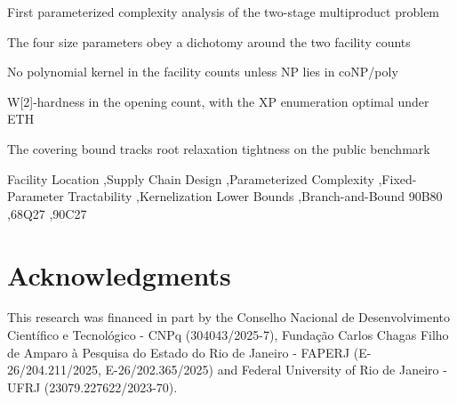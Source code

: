 \documentclass[a4paper,fleqn]{cas-sc}
\theoremstyle{definition}
\theoremstyle{remark}
\begin{document}
\begin{highlights}
\item First parameterized complexity analysis of the two-stage
multiproduct problem
\item The four size parameters obey a dichotomy around the two facility
counts
\item No polynomial kernel in the facility counts unless NP lies in
coNP/poly
\item W[2]-hardness in the opening count, with the XP enumeration
optimal under ETH
\item The covering bound tracks root relaxation tightness on the public
benchmark
\end{highlights}

\begin{keywords}
Facility Location \sep Supply Chain Design \sep Parameterized
Complexity \sep Fixed-Parameter Tractability \sep Kernelization Lower
Bounds \sep Branch-and-Bound
\MSC[2020] 90B80 \sep 68Q27 \sep 90C27
\end{keywords}

\maketitle










\section*{Acknowledgments}

This research was financed in part by the Conselho Nacional de
Desenvolvimento Cient\'ifico e Tecnol\'ogico - CNPq (304043/2025-7),
Funda\c{c}\~ao Carlos Chagas Filho de Amparo \`a Pesquisa do Estado do
Rio de Janeiro - FAPERJ (E-26/204.211/2025, E-26/202.365/2025) and
Federal University of Rio de Janeiro - UFRJ (23079.227622/2023-70).




\appendix

\end{document}
